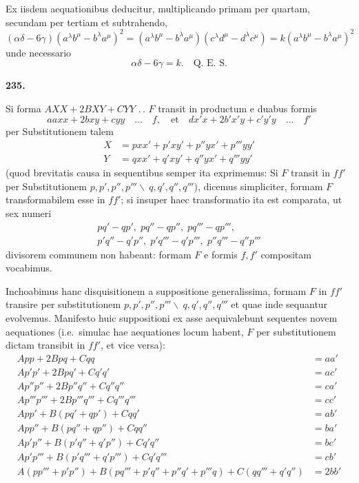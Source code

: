 \documentclass[12pt,a4paper]{article}
\theoremstyle{plain}
\theoremstyle{definition}
\theoremstyle{remark}
\begin{document}
Ex iisdem aequationibus deducitur, multiplicando primam per quartam, secundam per tertiam et subtrahendo,
\[
(\alpha\delta - 6\gamma)(a^{\lambda}b^{\mu} - b^{\lambda}a^{\mu})^{2} = (a^{\lambda}b^{\mu} - b^{\lambda}a^{\mu})(c^{\lambda}d^{\mu} - d^{\lambda}c^{\mu}) = k(a^{\lambda}b^{\mu} - b^{\lambda}a^{\mu})^{2}
\]
unde necessario
\[
\alpha\delta - 6\gamma = k. \quad \text{Q.\ E.\ S.}
\]


\newpage
\begin{center}\textbf{235.}\end{center}

Si forma $AXX + 2BXY + CYY$ .\,. $F$ transit in productum e duabus formis
\[
aaxx + 2bxy + cyy \quad \ldots \quad f, \quad \text{et} \quad dx'x + 2b'x'y + c'y'y \quad \ldots \quad f'
\]
per Substitutionem talem
\begin{align*}
X &= pxx' + p'xy' + p''yx' + p'''yy' \\
Y &= qxx' + q'xy' + q''yx' + q'''yy'
\end{align*}
(quod brevitatis causa in sequentibus semper ita exprimemus: Si $F$ transit in $ff'$ per Substitutionem $p, p', p'', p''' \backslash\ q, q', q'', q'''$), dicemus simpliciter, formam $F$ transformabilem esse in $ff'$; si insuper haec transformatio ita est comparata, ut sex numeri
\begin{multline*}
pq' - qp', \; pq'' - qp'', \; pq''' - qp''', \\
p'q'' - q'p'', \; p'q''' - q'p''', \; p''q''' - q''p'''
\end{multline*}
divisorem communem non habeant: formam $F$ e formis $f, f'$ compositam vocabimus.

Inchoabimus hanc disquisitionem a suppositione generalissima, formam $F$ in $ff'$ transire per substitutionem $p, p', p'', p''' \backslash\ q, q', q'', q'''$ et quae inde sequantur evolvemus. Manifesto huic suppositioni ex asse aequivalebunt sequentes novem aequationes (i.e.\ simulac hae aequationes locum habent, $F$ per substitutionem dictam transibit in $ff'$, et vice versa):
\begin{align}
App + 2Bpq + Cqq &= aa' \tag{1} \\
Ap'p' + 2Bpq' + Cq'q' &= ac' \tag{2} \\
Ap''p'' + 2Bp''q'' + Cq''q'' &= ca' \tag{3} \\
Ap'''p''' + 2Bp'''q''' + Cq'''q''' &= cc' \tag{4} \\
App' + B(pq' + qp') + Cqq' &= ab' \tag{5} \\
App'' + B(pq'' + qp'') + Cqq'' &= ba' \tag{6} \\
Ap'p'' + B(p'q'' + q'p'') + Cq'q'' &= bc' \tag{7} \\
Ap'p''' + B(p'q''' + q'p''') + Cq'q''' &= cb' \tag{8} \\
A(pp''' + p'p'') + B(pq''' + p'q'' + p''q' + p'''q) + C(qq''' + q'q'') &= 2bb' \tag{9}
\end{align}
\end{document}
